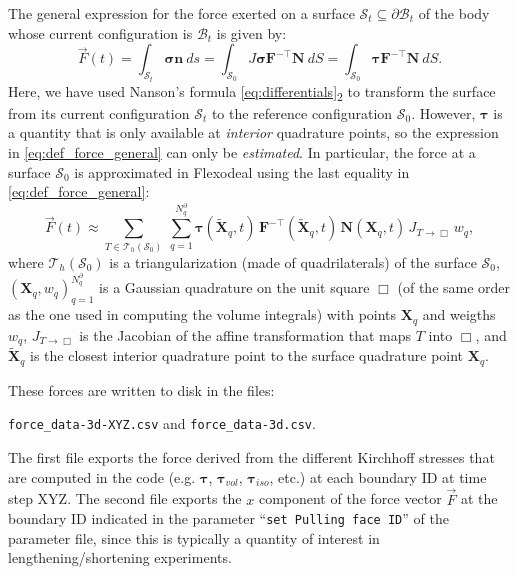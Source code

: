 \documentclass{sfuthesis}
\numberwithin{equation}{section}
\numberwithin{figure}{chapter}
\numberwithin{table}{chapter}
\theoremstyle{definition}
\def\*#1{{\mathbf{#1}}} %
\newcommand{\B}{\mathcal{B}}
\def\bsigma{{\bm{\sigma}}}
\def\btau{{\bm{\tau}}}
\begin{document}
The general expression for the force exerted on a surface $\mathcal{S}_t \subseteq \partial \B_t$ of the body whose current configuration is $\B_t$ is given by:
\begin{equation} \label{eq:def_force_general}
    \vec{F}(t) = \int_{\mathcal{S}_t} \bsigma \*n \ ds = \int_{\mathcal{S}_0} J \bsigma \*F^{-\top} \*N \ dS = \int_{\mathcal{S}_0} \btau \*F^{-\top} \*N \ dS.
\end{equation}
Here, we have used Nanson's formula \eqref{eq:differentials}\textsubscript{2} to transform the surface from its current configuration $\mathcal{S}_t$ to the reference configuration $\mathcal{S}_0$. However, $\btau$ is a quantity that is only available at \textit{interior} quadrature points, so the expression in \eqref{eq:def_force_general} can only be \textit{estimated}. In particular, the force at a surface $\mathcal{S}_0$ is approximated in Flexodeal using the last equality in \eqref{eq:def_force_general}:
\begin{equation} \label{eq:def_force_approximated}
    \vec{F}(t) \approx \sum_{T \in \mathcal{T}_h(\mathcal{S}_0)} \ \sum_{q = 1}^{N_q^\partial} \btau(\widetilde{\*X}_q, t) \, \*F^{-\top}(\widetilde{\*X}_q, t) \, \*N(\*X_q, t) \, J_{T \to \Box} \, w_q,
\end{equation}
where $\mathcal{T}_h(\mathcal{S}_0)$ is a triangularization (made of quadrilaterals) of the surface $\mathcal{S}_0$, $(\*X_q, w_q)_{q = 1}^{N_q^\partial}$ is a Gaussian quadrature on the unit square $\Box$ (of the same order as the one used in computing the volume integrals) with points $\*X_q$ and weigths $w_q$, $J_{T \to \Box}$ is the Jacobian of the affine transformation that maps $T$ into $\Box$, and $\widetilde{\*X}_q$ is the closest interior quadrature point to the surface quadrature point $\*X_q$.

These forces are written to disk in the files:
\begin{center}
    \texttt{force\_data-3d-XYZ.csv} and \texttt{force\_data-3d.csv}.
\end{center}
The first file exports the force derived from the different Kirchhoff stresses that are computed in the code (e.g. $\btau$, $\btau_{vol}$, $\btau_{iso}$, etc.) at each boundary ID at time step XYZ. The second file exports the $x$ component of the force vector $\vec{F}$ at the boundary ID indicated in the parameter ``\texttt{set Pulling face ID}'' of the parameter file, since this is typically a quantity of interest in lengthening/shortening experiments. 
\end{document}
